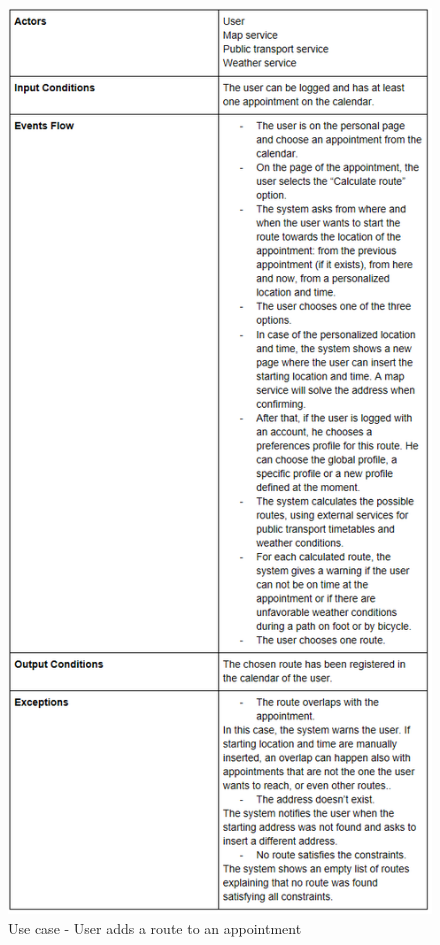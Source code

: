 \begin{figure}
	\centering
	\includegraphics[totalheight=\textheight]{Images/UseCaseTables/4_The_user_add_route.png}
	\caption{\label{fig:useCase4}Use case - User adds a route to an appointment }
\end{figure}

